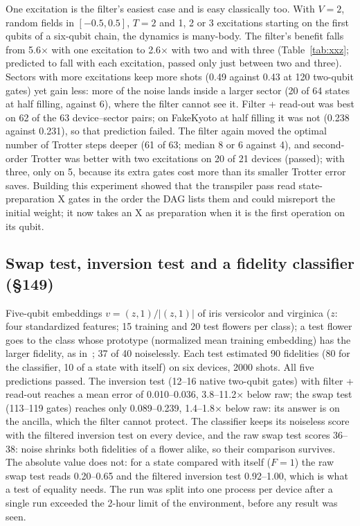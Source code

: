 \documentclass[11pt]{article}
\begin{document}
One excitation is the filter's easiest case and is easy classically too. With $V=2$, random fields in
$[-0.5,0.5]$, $T=2$ and 1, 2 or 3 excitations starting on the first qubits of a six-qubit chain, the dynamics
is many-body. The filter's benefit falls from 5.6$\times$ with one excitation to 2.6$\times$ with two and with
three (Table~\ref{tab:xxz}; predicted to fall with each excitation, passed only just between two and three).
Sectors with more excitations keep more shots (0.49 against 0.43 at 120 two-qubit gates) yet gain less: more
of the noise lands inside a larger sector (20 of 64 states at half filling, against 6), where the filter
cannot see it. Filter + read-out was best on 62 of the 63 device--sector pairs; on FakeKyoto at half filling
it was not (0.238 against 0.231), so that prediction failed. The filter again moved the optimal number of
Trotter steps deeper (61 of 63; median 8 or 6 against 4), and second-order Trotter was better with two
excitations on 20 of 21 devices (passed); with three, only on 5, because its extra gates cost more than its
smaller Trotter error saves. Building this experiment showed that the transpiler pass read state-preparation
X gates in the order the DAG lists them and could misreport the initial weight; it now takes an X as
preparation when it is the first operation on its qubit.

\subsection{Swap test, inversion test and a fidelity classifier (§149)}

Five-qubit embeddings $v=(z,1)/|(z,1)|$ of iris versicolor and virginica ($z$: four standardized features;
15 training and 20 test flowers per class); a test flower goes to the class whose prototype (normalized mean
training embedding) has the larger fidelity, as in~\cite{blank2020kernel}; 37 of 40 noiselessly. Each test
estimated 90 fidelities (80 for the classifier, 10 of a state with itself) on six devices, 2000 shots. All
five predictions passed. The inversion test (12--16 native two-qubit gates) with filter + read-out reaches a
mean error of 0.010--0.036, 3.8--11.2$\times$ below raw; the swap test (113--119 gates) reaches only
0.089--0.239, 1.4--1.8$\times$ below raw: its answer is on the ancilla, which the filter cannot protect. The
classifier keeps its noiseless score with the filtered inversion test on every device, and the raw swap test
scores 36--38: noise shrinks both fidelities of a flower alike, so their comparison survives. The absolute
value does not: for a state compared with itself ($F=1$) the raw swap test reads 0.20--0.65 and the
filtered inversion test 0.92--1.00, which is what a test of equality needs. The run was split into one
process per device after a single run exceeded the 2-hour limit of the environment, before any result was
seen.
\end{document}
